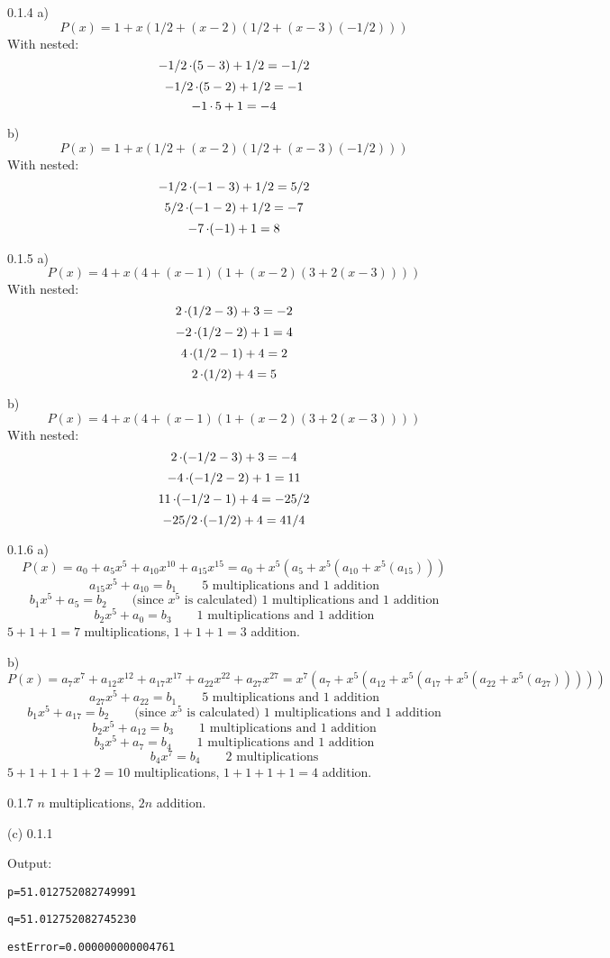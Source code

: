 \begin{task}{0.1.4 a)}
\[P(x)=1+x(1/2+(x-2)(1/2+(x-3)(-1/2)))\]
With nested:
\[-1/2\operatorname{\cdot}(5-3)+1/2=-1/2\]
\[-1/2\operatorname{\cdot}(5-2)+1/2=-1\]
\[-1\operatorname{\cdot}5+1=-4\]
\end{task}

\begin{task}{b)}
\[P(x)=1+x(1/2+(x-2)(1/2+(x-3)(-1/2)))\]
With nested:
\[-1/2\operatorname{\cdot}(-1-3)+1/2=5/2\]
\[5/2\operatorname{\cdot}(-1-2)+1/2=-7\]
\[-7\operatorname{\cdot}(-1)+1=8\]
\end{task}

\begin{task}{0.1.5 a)}
\[P(x)=4+x(4+(x-1)(1+(x-2)(3+2(x-3))))\]
With nested:
\[2\operatorname{\cdot}(1/2-3)+3=-2\]
\[-2\operatorname{\cdot}(1/2-2)+1=4\]
\[4\operatorname{\cdot}(1/2-1)+4=2\]
\[2\operatorname{\cdot}(1/2)+4=5\]
\end{task}

\begin{task}{b)}
\[P(x)=4+x(4+(x-1)(1+(x-2)(3+2(x-3))))\]
With nested:
\[2\operatorname{\cdot}(-1/2-3)+3=-4\]
\[-4\operatorname{\cdot}(-1/2-2)+1=11\]
\[11\operatorname{\cdot}(-1/2-1)+4=-25/2\]
\[-25/2\operatorname{\cdot}(-1/2)+4=41/4\]
\end{task}

\begin{task}{0.1.6 a)}
	\[P(x)=
	a_0+a_5x^5+a_{10}x^{10}+a_{15}x^{15}=
	a_0+x^5(a_{5}+x^{5}(a_{10}+x^{5}(a_{15})))\]
	\[a_{15}x^{5}+a_{10}=b_1\qquad\text{5 multiplications and 1 addition}\]
	\[b_1x^{5}+a_{5}=b_2\qquad\text{(since $x^5$ is calculated) 1 multiplications and 1 addition}\]
	\[b_2x^{5}+a_0=b_3\qquad\text{1 multiplications and 1 addition}\]
	$5+1+1=7$ multiplications, $1+1+1=3$ addition.
\end{task}

\begin{task}{b)}
\[P(x)=
a_7x^7+a_{12}x^{12}+a_{17}x^{17}+a_{22}x^{22}+a_{27}x^{27}=
x^7(a_{7}+x^{5}(a_{12}+x^{5}(a_{17}+x^5(a_{22}+x^{5}(a_{27})))))\]
\[a_{27}x^{5}+a_{22}=b_1\qquad\text{5 multiplications and 1 addition}\]
\[b_1x^{5}+a_{17}=b_2\qquad\text{(since $x^5$ is calculated) 1 multiplications and 1 addition}\]
\[b_2x^{5}+a_{12}=b_3\qquad\text{1 multiplications and 1 addition}\]
\[b_3x^{5}+a_{7}=b_4\qquad\text{1 multiplications and 1 addition}\]
\[b_4x^{7}=b_4\qquad\text{2 multiplications}\]
$5+1+1+1+2=10$ multiplications, $1+1+1+1=4$ addition.
\end{task}

\begin{task}{0.1.7}
$n$ multiplications, $2n$ addition.
\end{task}

\begin{task}{(c) 0.1.1}

Output:

\texttt{p=51.012752082749991}

\texttt{q=51.012752082745230}

\texttt{estError=0.000000000004761}

\end{task}

